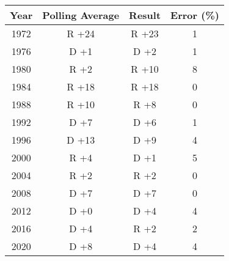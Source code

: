 \documentclass{article}\usepackage[]{graphicx}\usepackage[]{color}
\begin{document}
\begin{center}
 \begin{tabular}{||c c c c||} 
 \hline
  Year & Polling Average & Result & Error (\%)  \\ [0.5ex] 
 \hline\hline
 1972 & R +24  & R +23 & 1 \\ 
 \hline
 1976 & D +1 & D +2 & 1 \\
 \hline
 1980 & R +2 & R +10 & 8 \\
 \hline
 1984 & R +18 & R +18 & 0 \\
 \hline
 1988 & R +10 & R +8 & 0 \\  
 \hline
 1992 & D +7 & D +6 & 1 \\  
 \hline
 1996 & D +13 & D +9 & 4 \\  
 \hline
 2000 & R +4 & D +1 & 5 \\  
 \hline
 2004 & R +2 & R +2 & 0 \\  
 \hline
 2008 & D +7 & D +7 & 0 \\  
 \hline
 2012 & D +0 & D +4 & 4 \\  
 \hline
 2016 & D +4 & R +2 & 2 \\  
 \hline
 2020 & D +8 & D +4 & 4 \\  
 \hline
\end{tabular}
\end{center}
\end{document}
